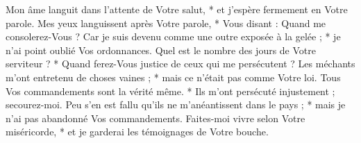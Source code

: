 Mon âme languit dans l'attente de Votre salut, * et j'espère fermement en Votre parole.
\versseparator
Mes yeux languissent après Votre parole, * Vous disant : Quand me consolerez-Vous ?
\versseparator
Car je suis devenu comme une outre exposée à la gelée ; * je n'ai point oublié Vos ordonnances.
\versseparator
Quel est le nombre des jours de Votre serviteur ? * Quand ferez-Vous justice de ceux qui me persécutent ?
\versseparator
Les méchants m'ont entretenu de choses vaines ; * mais ce n'était pas comme Votre loi.
\versseparator
Tous Vos commandements sont la vérité même. * Ils m'ont persécuté injustement ; secourez-moi.
\versseparator
Peu s'en est fallu qu'ils ne m'anéantissent dans le pays ; * mais je n'ai pas abandonné Vos commandements.
\versseparator
Faites-moi vivre selon Votre miséricorde, * et je garderai les témoignages de Votre bouche.